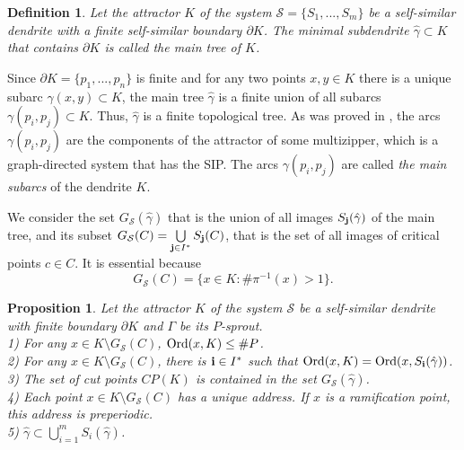 \documentclass[11pt,reqno]{amsart}
\newtheorem{definition}[theorem]{Definition}
\newtheorem{proposition}[theorem]{Proposition}
\newcommand{\hga}{{\hat\gamma}}
\newcommand{\eS}{{\mathcal S}}
\begin{document}
 \begin{definition}\label{mtree}\cite{STV}
Let the attractor $K$ of the  system ${\eS}=\{S_1,...,S_m\}$ be a self-similar dendrite with a finite self-similar boundary $\partial K$. 
The minimal subdendrite $\hga{\subset} K$ that contains $\partial K$ is called the {\em main tree} of $K$.
\end{definition}
Since  $\partial K=\{p_1,...,p_n\}$ is finite and for any two points $x,y\in K$ there is a unique subarc $\gamma(x,y){\subset} K$,
the main tree $\hga$ is a finite union of all subarcs $\gamma(p_i,p_j){\subset} K$. Thus, $\hga$ is
a finite topological tree. As was proved in
\cite[Theorem 15] {STV}, the arcs $\gamma(p_i,p_j)$ are the components of the attractor of some multizipper, which is a graph-directed
system that has the SIP. The arcs $\gamma(p_i,p_j)$ are called {\em the main subarcs} of the dendrite $K$.

We consider the set $G_{\eS}(\hga)$ that is the union of all images $S_{\bf j}(\hga)$ of the main tree, and its subset
$G_{\eS}(C)=\bigcup\limits_{{\bf j}\in I^*} S_{\bf j}(C)$, that is the set of all images of critical points $c\in C$.  It is essential because  
\begin{equation}\label{uadr}
 G_{\eS}(C)=\{x\in K: \#\pi^{-1}(x)>1\}.  
\end{equation}



\begin{proposition}\label{ord_cut}
Let the attractor $K$ of the system ${\eS}$ be a self-similar dendrite with finite boundary ${\partial} K$ and $\Gamma$ be its $P$-sprout.\\
1) %
For any $x\in K\setminus G_{\eS}(C)$, ${\mathop{\rm Ord} \nolimits}(x,K)\le\#P$.\\
2)  For any $x\in K\setminus G_{\eS}(C)$, there is ${\bf {i}}\in {I^*}$ such that ${\mathop{\rm Ord} \nolimits}(x,K)={\mathop{\rm Ord} \nolimits}(x,S_{\bf {i}}(\hga))$.\\
3) The set of cut points $CP(K)$ is contained in the set $ G_{\eS}(\hat \gamma)$.\\ 
4) Each  point $x\in K\setminus G_{{\eS}}(C)$ has a unique  address. If $x$ is a ramification point, this address is preperiodic.\\
5) $\hga{\subset} \bigcup\limits_{i=1}^m S_i(\hat \gamma)$.
\end{proposition}
\end{document}
